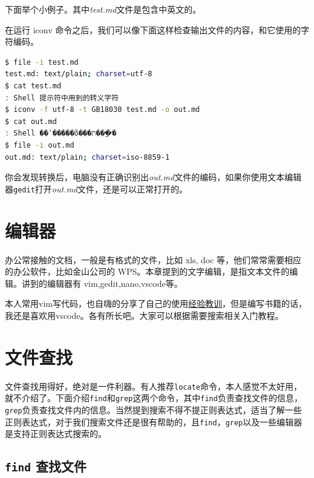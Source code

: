 \documentclass[doctor,openright,twoside]{sjtuthesis}
\newcommand{\passthrough}[1]{#1}
\theoremstyle{plain}
\theoremstyle{definition}
\theoremstyle{remark}
\theoremstyle{ocrenumbox}
\theoremstyle{plain}
\begin{document}
下面举个小例子。其中\emph{test.md}文件是包含中英文的。

在运行 iconv 命令之后，我们可以像下面这样检查输出文件的内容，和它使用的字符编码。

\begin{lstlisting}[language=bash]
$ file -i test.md
test.md: text/plain; charset=utf-8
$ cat test.md 
: Shell 提示符中用到的转义字符
$ iconv -f utf-8 -t GB18030 test.md -o out.md
$ cat out.md
: Shell ��ʾ�����õ���ת���ַ�
$ file -i out.md
out.md: text/plain; charset=iso-8859-1
\end{lstlisting}

你会发现转换后，电脑没有正确识别出\emph{out.md}文件的编码，如果你使用文本编辑器\passthrough{\lstinline!gedit!}打开\emph{out.md}文件，还是可以正常打开的。

\hypertarget{section-77}{%
\section{编辑器}\label{section-77}}

办公常接触的文档，一般是有格式的文件，比如 xls, doc 等，他们常常需要相应的办公软件，比如金山公司的 WPS。本章提到的文字编辑，是指文本文件的编辑。讲到的编辑器有 vim,gedit,nano,vscode等。

本人常用vim写代码，也自嗨的分享了自己的使用\href{https://my.oschina.net/bubifengyun/blog/163516}{经验教训}，但是编写书籍的话，我还是喜欢用vscode。各有所长吧。大家可以根据需要搜索相关入门教程。

\hypertarget{section-78}{%
\section{文件查找}\label{section-78}}

文件查找用得好，绝对是一件利器。有人推荐\passthrough{\lstinline!locate!}命令，本人感觉不太好用，就不介绍了。下面介绍\passthrough{\lstinline!find!}和\passthrough{\lstinline!grep!}这两个命令，其中\passthrough{\lstinline!find!}负责查找文件的信息，\passthrough{\lstinline!grep!}负责查找文件内的信息。当然提到搜索不得不提正则表达式，适当了解一些正则表达式，对于我们搜索文件还是很有帮助的，且\passthrough{\lstinline!find!}，\passthrough{\lstinline!grep!}以及一些编辑器是支持正则表达式搜索的。

\hypertarget{find-}{%
\subsection{\texorpdfstring{\texttt{find} 查找文件}{find 查找文件}}\label{find-}}
\end{document}
